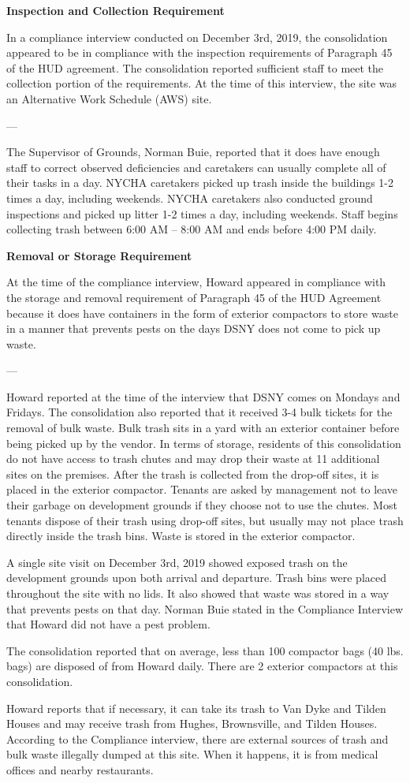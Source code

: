 
\textbf{Inspection and Collection Requirement}

In a compliance interview conducted on December 3rd, 2019, the consolidation appeared to be in compliance with the inspection requirements of Paragraph 45 of the HUD agreement. The consolidation reported sufficient staff to meet the collection portion of the requirements. At the time of this interview, the site was an Alternative Work Schedule (AWS) site. 

---

The Supervisor of Grounds, Norman Buie, reported that it does have enough staff to correct observed deficiencies and caretakers can usually complete all of their tasks in a day. NYCHA caretakers picked up trash inside the buildings 1-2 times a day, including weekends. NYCHA caretakers also conducted ground inspections and picked up litter 1-2 times a day, including weekends. Staff begins collecting trash between 6:00 AM -- 8:00 AM and ends before 4:00 PM daily.

\textbf{Removal or Storage Requirement}

At the time of the compliance interview, Howard appeared in compliance with the storage and removal requirement of Paragraph 45 of the HUD Agreement because it does have containers in the form of exterior compactors to store waste in a manner that prevents pests on the days DSNY does not come to pick up waste. 

---

Howard reported at the time of the interview that DSNY comes on Mondays and Fridays. The consolidation also reported that it received 3-4 bulk tickets for the removal of bulk waste. Bulk trash sits in a yard with an exterior container before being picked up by the vendor. In terms of storage, residents of this consolidation do not have access to trash chutes and may drop their waste at 11 additional sites on the premises. After the trash is collected from the drop-off sites, it is placed in the exterior compactor. Tenants are asked by management not to leave their garbage on development grounds if they choose not to use the chutes. Most tenants dispose of their trash using drop-off sites, but usually may not place trash directly inside the trash bins. Waste is stored in the exterior compactor. 

A single site visit on December 3rd, 2019 showed exposed trash on the development grounds upon both arrival and departure. Trash bins were placed throughout the site with no lids. It also showed that waste was stored in a way that prevents pests on that day. Norman Buie stated in the Compliance Interview that Howard did not have a pest problem. 

The consolidation reported that on average, less than 100 compactor bags (40 lbs. bags) are disposed of from Howard daily. There are 2 exterior compactors at this consolidation.

Howard reports that if necessary, it can take its trash to Van Dyke and Tilden Houses and may receive trash from Hughes, Brownsville, and Tilden Houses. According to the Compliance interview, there are external sources of trash and bulk waste illegally dumped at this site. When it happens, it is from medical offices and nearby restaurants. 